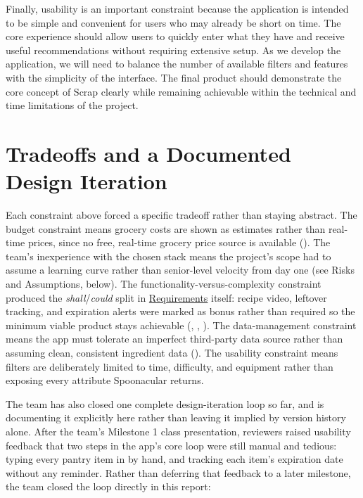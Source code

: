 Finally, usability is an important constraint because the application is intended to be simple and convenient for users who may already be short on time. The core experience should allow users to quickly enter what they have and receive useful recommendations without requiring extensive setup. As we develop the application, we will need to balance the number of available filters and features with the simplicity of the interface. The final product should demonstrate the core concept of Scrap clearly while remaining achievable within the technical and time limitations of the project.

\section{Tradeoffs and a Documented Design Iteration}\label{Section:DesignIteration}

\noindent Each constraint above forced a specific tradeoff rather than staying abstract. The budget constraint means grocery costs are shown as estimates rather than real-time prices, since no free, real-time grocery price source is available (). The team's inexperience with the chosen stack means the project's scope had to assume a learning curve rather than senior-level velocity from day one (see Risks and Assumptions, below). The functionality-versus-complexity constraint produced the \textit{shall}/\textit{could} split in \hyperref[Chapter:Requirements]{Requirements} itself: recipe video, leftover tracking, and expiration alerts were marked as bonus rather than required so the minimum viable product stays achievable (, , ). The data-management constraint means the app must tolerate an imperfect third-party data source rather than assuming clean, consistent ingredient data (). The usability constraint means filters are deliberately limited to time, difficulty, and equipment rather than exposing every attribute Spoonacular returns.

\noindent The team has also closed one complete design-iteration loop so far, and is documenting it explicitly here rather than leaving it implied by version history alone. After the team's Milestone 1 class presentation, reviewers raised usability feedback that two steps in the app's core loop were still manual and tedious: typing every pantry item in by hand, and tracking each item's expiration date without any reminder. Rather than deferring that feedback to a later milestone, the team closed the loop directly in this report:

